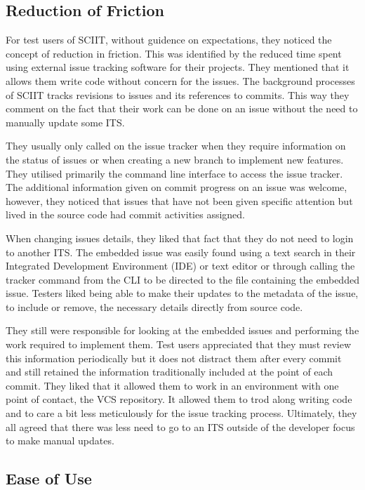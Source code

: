 \documentclass{mproj}
\begin{document}
\subsection{Reduction of Friction}

For test users of SCIIT, without guidence on expectations, they noticed the concept of reduction in friction. This was identified by the reduced time spent using external issue tracking software for their projects. They mentioned that it allows them write code without concern for the issues. The background processes of SCIIT tracks revisions to issues and its references to commits. This way they comment on the fact that their work can be done on an issue without the need to manually update some ITS.

They usually only called on the issue tracker when they require information on the status of issues or when creating a new branch to implement new features. They utilised primarily the command line interface to access the issue tracker. The additional information given on commit progress on an issue was welcome, however, they noticed that issues that have not been given specific attention but lived in the source code had commit activities assigned.

When changing issues details, they liked that fact that they do not need to login to another ITS. The embedded issue was easily found using a text search in their Integrated Development Environment (IDE) or text editor or through calling the tracker command from the CLI to be directed to the file containing the embedded issue. Testers liked being able to make their updates to the metadata of the issue, to include or remove, the necessary details directly from source code.

They still were responsible for looking at the embedded issues and performing the work required to implement them. Test users appreciated that they must review this information periodically but it does not distract them after every commit and still retained the information traditionally included at the point of each commit. They liked that it allowed them to work in an environment with one point of contact, the VCS repository. It allowed them to trod along writing code and to care a bit less meticulously for the issue tracking process. Ultimately, they all agreed that there was less need to go to an ITS outside of the developer focus to make manual updates.

\subsection{Ease of Use}
\end{document}
